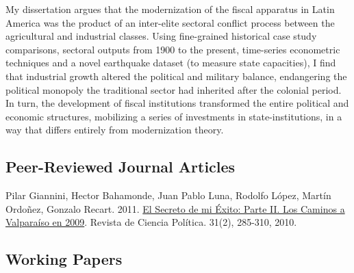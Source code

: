 \documentclass[letterpaper]{article}
\renewenvironment{itemize}{
  \begin{list}{}{
    \setlength{\leftmargin}{1.5em}
  }
}{
  \end{list}
}
\begin{document}
My dissertation argues that the modernization of the fiscal apparatus in Latin America was the product of an inter-elite sectoral conflict process between the agricultural and industrial classes. Using fine-grained historical case study comparisons, sectoral outputs from 1900 to the present, time-series econometric techniques and a novel earthquake dataset (to measure state capacities), I find that industrial growth altered the political and military balance, endangering the political monopoly the traditional sector had inherited after the colonial period. In turn, the development of fiscal institutions transformed the entire political and economic structures, mobilizing a series of investments in state-institutions, in a way that differs entirely from modernization theory.



\subsection*{Peer-Reviewed Journal Articles}

\begin{itemize}
\item Pilar Giannini, Hector Bahamonde, Juan Pablo Luna, Rodolfo L\'opez, Mart\'in Ordo\~nez, Gonzalo Recart. 2011. \href{http://www.revistacienciapolitica.cl/rcp/wp-content/uploads/2013/09/07_vol_31_2.pdf}{El Secreto de mi \'Exito: Parte II. Los Caminos a Valpara\'iso en 2009}. Revista de Ciencia Pol\'itica. 31(2), 285-310, 2010.
\end{itemize}



\subsection*{Working Papers}
\end{document}

